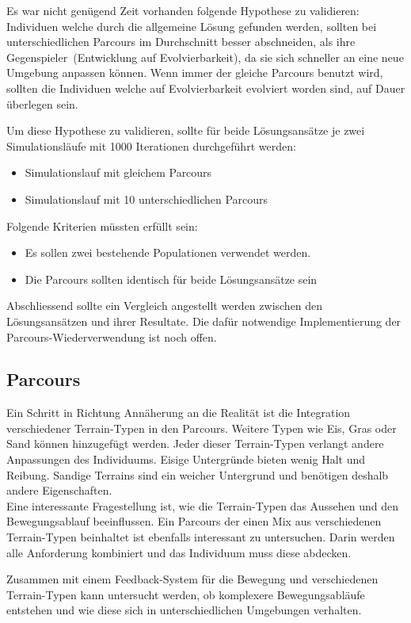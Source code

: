       Es war nicht genügend Zeit vorhanden folgende Hypothese zu validieren:
      Individuen welche durch die allgemeine Lösung gefunden werden,
      sollten bei unterschiedlichen Parcours im Durchschnitt besser abschneiden,
      als ihre Gegenspieler~(Entwicklung auf Evolvierbarkeit),
      da sie sich schneller an eine neue Umgebung anpassen können.
      Wenn immer der gleiche Parcours benutzt wird,
      sollten die Individuen welche auf Evolvierbarkeit evolviert worden sind, auf Dauer überlegen sein.

      \medskip

      Um diese Hypothese zu validieren,
      sollte für beide Lösungsansätze je zwei Simulationsläufe mit 1000 Iterationen durchgeführt werden:

      \begin{itemize}
        \item Simulationslauf mit gleichem Parcours
        \item Simulationslauf mit 10 unterschiedlichen Parcours
      \end{itemize}

      \medskip

      Folgende Kriterien müssten erfüllt sein:

      \begin{itemize}
        \item Es sollen zwei bestehende Populationen verwendet werden.
        \item Die Parcours sollten identisch für beide Lösungsansätze sein
      \end{itemize}

      Abschliessend sollte ein Vergleich angestellt werden zwischen den Lösungsansätzen und ihrer Resultate.
      Die dafür notwendige Implementierung der Parcours-Wiederverwendung ist noch offen.

    \subsection{Parcours}

      Ein Schritt in Richtung Annäherung an die Realität ist die Integration
      verschiedener Terrain-Typen in den Parcours. Weitere Typen wie Eis, Gras oder Sand können hinzugefügt werden.
      Jeder dieser Terrain-Typen verlangt andere Anpassungen des Individuums.
      Eisige Untergründe bieten wenig Halt und Reibung.
      Sandige Terrains sind ein weicher Untergrund und benötigen deshalb andere Eigenschaften.
      \\
      Eine interessante Fragestellung ist, wie die Terrain-Typen das Aussehen und den Bewegungsablauf beeinflussen.
      Ein Parcours der einen Mix aus verschiedenen Terrain-Typen beinhaltet ist ebenfalls interessant zu untersuchen.
      Darin werden alle Anforderung kombiniert und das Individuum muss diese abdecken.

      \medskip

      Zusammen mit einem Feedback-System für die Bewegung und verschiedenen Terrain-Typen kann untersucht werden,
      ob komplexere Bewegungsabläufe entstehen und wie diese sich in unterschiedlichen Umgebungen verhalten.
